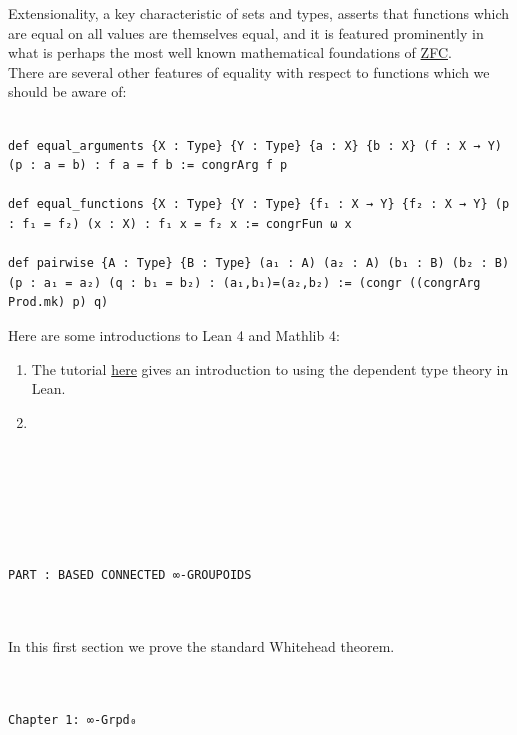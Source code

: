 \documentclass{book}
\theoremstyle{definition}
\newcounter{pcounter}
\newcounter{lcounter}
\renewcommand{\chapter}[1]{
\newpage
{
\Huge 
\begin{center}
\ \\
\ \\
\thispagestyle{empty}
\texttt{#1}
\end{center}}
\ \\
\ \\
}
\newcounter{partcount}
\renewcommand{\part}[1]{
\newpage
{
\Huge 
\begin{center}
\ \\
\ \\
\ \\
\ \\
\ \\
\ \\
\thispagestyle{empty}
\texttt{PART {\thepartcount}: #1}
\stepcounter{partcount}
\end{center}}
\ \\
\ \\
}
\begin{document}
Extensionality, a key characteristic of sets and types, asserts that functions which are equal on all values are themselves equal, and it is featured prominently in what is perhaps the most well known mathematical foundations of \href{https://encyclopediaofmath.org/wiki/ZFC}{ZFC}.\\

There are several other features of equality with respect to functions which we should be aware of:

\begin{center}
\begin{tcolorbox}[width=5in,colback={white},title={\begin{center}\texttt{Lean \thelcounter} \addtocounter{lcounter}{1}  \end{center}},colbacktitle=Blue,coltitle=black]
\begin{verbatim}

def equal_arguments {X : Type} {Y : Type} {a : X} {b : X} (f : X → Y) (p : a = b) : f a = f b := congrArg f p

def equal_functions {X : Type} {Y : Type} {f₁ : X → Y} {f₂ : X → Y} (p : f₁ = f₂) (x : X) : f₁ x = f₂ x := congrFun ω x

def pairwise {A : Type} {B : Type} (a₁ : A) (a₂ : A) (b₁ : B) (b₂ : B) (p : a₁ = a₂) (q : b₁ = b₂) : (a₁,b₁)=(a₂,b₂) := (congr ((congrArg Prod.mk) p) q)

\end{verbatim}
\end{tcolorbox}
\end{center}

Here are some introductions to Lean 4 and Mathlib 4:

\begin{enumerate}
\item The tutorial \href{https://leanprover.github.io/theorem_proving_in_lean4/}{here} gives an introduction to using the dependent type theory in Lean.
\item 
\end{enumerate}


\part{BASED CONNECTED ∞-GROUPOIDS}

In this first section we prove the standard Whitehead theorem.\\


\chapter{Chapter 1: ∞\texttt{-Grpd₀}}
\end{document}
